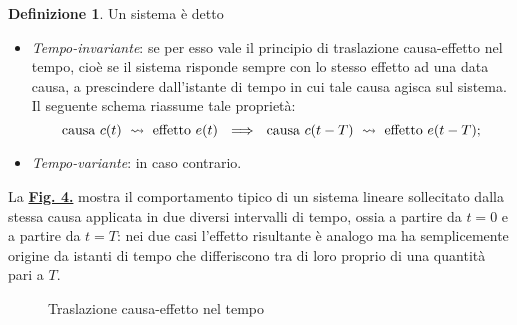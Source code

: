 \documentclass[a4paper]{article}
\theoremstyle{definition}
\newtheorem{defn}{Definizione}[subsection]
\begin{document}
		\begin{defn}
			Un sistema è detto
			\begin{itemize}
				\item \textit{Tempo-invariante}: se per esso vale il principio di traslazione causa-effetto nel tempo, cioè se il sistema risponde sempre con lo stesso effetto ad una data causa, a prescindere dall'istante di tempo in cui tale causa agisca
				sul sistema.\\
				Il seguente schema riassume tale proprietà:
				\[
					\textup{causa}\ c(t)\ \rightsquigarrow \ \textup{effetto}\ e(t)\ \
					\Longrightarrow\ \ \textup{causa}\ c(t - T)\  \rightsquigarrow \ \textup{effetto}\ e(t-T);
				\]
				\item \textit{Tempo-variante}: in caso contrario.
			\end{itemize}
			
			La \hyperref[fig:time]{\textbf{Fig. 4.}} mostra il comportamento tipico di un sistema lineare sollecitato
			dalla stessa causa applicata in due diversi intervalli di tempo, ossia a partire da $ t = 0 $
			e a partire da $ t = T $: nei due casi l'effetto risultante è analogo ma ha semplicemente
			origine da istanti di tempo che differiscono tra di loro proprio di una quantità pari a $ T $.
			
			\begin{figure}[h!]
				\centering
				\caption{Traslazione causa-effetto nel tempo}
				\label{fig:time}
			\end{figure}
		\end{defn}
		
\end{document}
